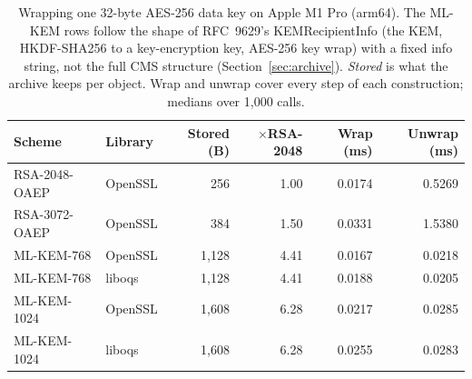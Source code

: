 \begin{table}[t]
\caption{Wrapping one 32-byte AES-256 data key on Apple M1 Pro (arm64). The ML-KEM rows follow the shape of RFC~9629's KEMRecipientInfo (the KEM, HKDF-SHA256 to a key-encryption key, AES-256 key wrap) with a fixed info string, not the full CMS structure (Section~\ref{sec:archive}). \emph{Stored} is what the archive keeps per object. Wrap and unwrap cover every step of each construction; medians over 1,000 calls.}
\label{tab:keywrap}
\begin{tabular}{llrrrr}
\toprule
Scheme & Library & Stored (B) & $\times$RSA-2048 & Wrap (ms) & Unwrap (ms)\\
\midrule
RSA-2048-OAEP & OpenSSL & 256 & 1.00 & 0.0174 & 0.5269\\
RSA-3072-OAEP & OpenSSL & 384 & 1.50 & 0.0331 & 1.5380\\
ML-KEM-768 & OpenSSL & 1,128 & 4.41 & 0.0167 & 0.0218\\
ML-KEM-768 & liboqs & 1,128 & 4.41 & 0.0188 & 0.0205\\
ML-KEM-1024 & OpenSSL & 1,608 & 6.28 & 0.0217 & 0.0285\\
ML-KEM-1024 & liboqs & 1,608 & 6.28 & 0.0255 & 0.0283\\
\bottomrule
\end{tabular}
\end{table}
